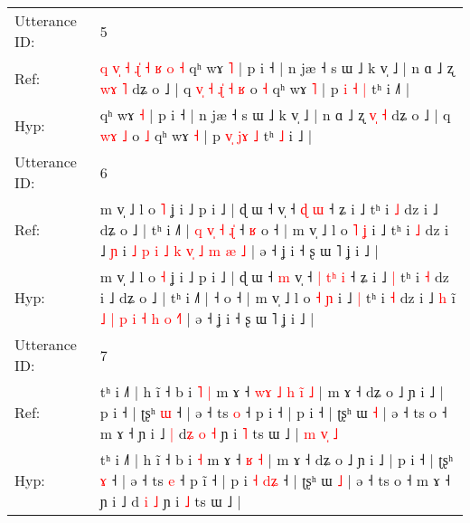 \documentclass[10pt]{article}
\DeclareRobustCommand{\hl}[1]{{\textcolor{red}{#1}}}
\begin{document}
\begin{longtable}{ll}
 \\
\midrule
Utterance ID: & 5 \\
Ref: & \hl{q}\hl{ }\hl{v}\hl{̩}\hl{ }\hl{˧}\hl{ }\hl{ɻ}\hl{̍}\hl{ }\hl{˧}\hl{ }\hl{ʁ}\hl{ }\hl{o}\hl{ }\hl{˧}\hl{ }qʰ wɤ \hl{˥} | p i ˧ | n jæ ˧ s ɯ ˩ k v̩ ˩ | n ɑ ˩ ʐ \hl{w}\hl{ɤ} \hl{˥} dʑ o ˩ | q\hl{ }\hl{v}\hl{̩}\hl{ }\hl{˧} \hl{ɻ}\hl{̍}\hl{ }\hl{˧} \hl{ʁ} o \hl{˧} qʰ wɤ \hl{˥} | p \hl{}\hl{i} \hl{}\hl{˧} \hl{|} tʰ\hl{}\hl{} i ˩\hl{˥} |
 \\
Hyp: & \hl{}\hl{}\hl{}\hl{}\hl{}\hl{}\hl{}\hl{}\hl{}\hl{}\hl{}\hl{}\hl{}\hl{}\hl{}\hl{}\hl{}\hl{}qʰ wɤ \hl{˧} | p i ˧ | n jæ ˧ s ɯ ˩ k v̩ ˩ | n ɑ ˩ ʐ \hl{v}\hl{̩} \hl{˧} dʑ o ˩ | q\hl{}\hl{}\hl{}\hl{}\hl{} \hl{}\hl{}\hl{w}\hl{ɤ} \hl{˩} o \hl{˩} qʰ wɤ \hl{˧} | p \hl{v}\hl{̩} \hl{j}\hl{ɤ} \hl{˩} tʰ\hl{ }\hl{˩} i ˩\hl{} |
 \\
\midrule
Utterance ID: & 6 \\
Ref: & m v̩ ˩ l o \hl{˥} ʝ i ˩ p i ˩ | ɖ ɯ ˧\hl{}\hl{} v̩ ˧\hl{}\hl{} \hl{}\hl{ɖ} \hl{ɯ} ˧ ʑ i ˩\hl{}\hl{} tʰ i \hl{˩} dz i ˩ dʑ o ˩ | tʰ i ˩˥ |\hl{ }\hl{q}\hl{ }\hl{v}\hl{̩}\hl{ }\hl{˧}\hl{ }\hl{ɻ}\hl{̍} ˧\hl{ }\hl{ʁ} o ˧ | m v̩ ˩ l o \hl{˥} \hl{ʝ} i ˩\hl{}\hl{} tʰ i \hl{˩} dz i ˩ \hl{ɲ} i\hl{ }\hl{˩} \hl{p} \hl{i} \hl{˩} \hl{k} \hl{v}\hl{̩} \hl{˩} \hl{m} \hl{æ}\hl{ }\hl{˩} | ə ˧ ʝ i ˧ ʂ ɯ ˥ ʝ i ˩ |
 \\
Hyp: & m v̩ ˩ l o \hl{˧} ʝ i ˩ p i ˩ | ɖ ɯ ˧\hl{ }\hl{m} v̩ ˧\hl{ }\hl{|} \hl{t}\hl{ʰ} \hl{i} ˧ ʑ i ˩\hl{ }\hl{|} tʰ i \hl{˧} dz i ˩ dʑ o ˩ | tʰ i ˩˥ |\hl{}\hl{}\hl{}\hl{}\hl{}\hl{}\hl{}\hl{}\hl{}\hl{} ˧\hl{}\hl{} o ˧ | m v̩ ˩ l o \hl{˧} \hl{ɲ} i ˩\hl{ }\hl{|} tʰ i \hl{˧} dz i ˩ \hl{h} i\hl{}\hl{̃} \hl{˩} \hl{|} \hl{p} \hl{i} \hl{}\hl{˧} \hl{h} \hl{o} \hl{}\hl{˧}\hl{˥} | ə ˧ ʝ i ˧ ʂ ɯ ˥ ʝ i ˩ |
 \\
\midrule
Utterance ID: & 7 \\
Ref: & tʰ i ˩˥ | h ĩ ˧ b i\hl{ }\hl{˥} \hl{|} m ɤ ˧\hl{ }\hl{w}\hl{ɤ}\hl{ }\hl{˩}\hl{ }\hl{h} \hl{i}\hl{̃} \hl{˩} | m ɤ ˧ dʑ o ˩ ɲ i ˩ | p i ˧ | ʈʂʰ \hl{ɯ} ˧ | ə ˧ ts \hl{o} ˧ p i\hl{} ˧ | p i\hl{}\hl{}\hl{}\hl{}\hl{} ˧ | ʈʂʰ ɯ \hl{˧} | ə ˧ ts o ˧ m ɤ ˧ ɲ i ˩\hl{ }\hl{|} d\hl{ʑ} \hl{o} \hl{˧} ɲ i \hl{˥} ts ɯ ˩ |\hl{ }\hl{m}\hl{ }\hl{v}\hl{̩}\hl{ }\hl{˩}
 \\
Hyp: & tʰ i ˩˥ | h ĩ ˧ b i\hl{}\hl{} \hl{˧} m ɤ ˧\hl{}\hl{}\hl{}\hl{}\hl{}\hl{}\hl{} \hl{}\hl{ʁ} \hl{˧} | m ɤ ˧ dʑ o ˩ ɲ i ˩ | p i ˧ | ʈʂʰ \hl{ɤ} ˧ | ə ˧ ts \hl{e} ˧ p i\hl{̃} ˧ | p i\hl{ }\hl{˧}\hl{ }\hl{d}\hl{ʑ} ˧ | ʈʂʰ ɯ \hl{˩} | ə ˧ ts o ˧ m ɤ ˧ ɲ i ˩\hl{}\hl{} d\hl{} \hl{i} \hl{˩} ɲ i \hl{˩} ts ɯ ˩ |\hl{}\hl{}\hl{}\hl{}\hl{}\hl{}\hl{}

\end{longtable}
\end{document}
